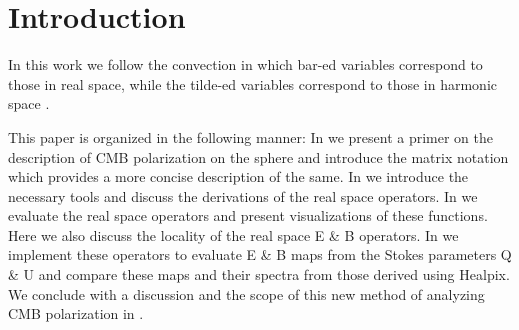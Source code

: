 \section{Introduction}

In this work we follow the convection in which bar-ed variables correspond to those in real space, while the tilde-ed variables correspond to those in harmonic space \cite{Zaldarriaga2001a}. 

This paper is organized in the following manner: In  we present a primer on the description of CMB polarization on the sphere and introduce the matrix notation which provides a more concise description of the same. In  we introduce the necessary tools  and discuss the derivations of the real space operators. In  we evaluate the real space operators and present visualizations of these functions. Here we also discuss the locality of the real space E \& B operators. In  we implement these operators to evaluate E \& B  maps from the Stokes parameters Q \& U and compare these maps and their spectra from those derived using Healpix. We conclude with a discussion and the scope of this new method of analyzing CMB polarization in .